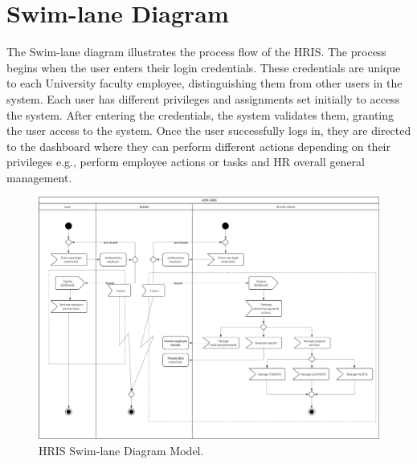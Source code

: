 
\section{Swim-lane Diagram}
The Swim-lane diagram illustrates the process flow of the HRIS. The process begins when the user enters their login credentials. These credentials are unique to each University faculty employee, distinguishing them from other users in the system. Each user has different privileges and assignments set initially to access the system. After entering the credentials, the system validates them, granting the user access to the system. Once the user successfully logs in, they are directed to the dashboard where they can perform different actions depending on their privileges e.g., perform employee actions or tasks and HR overall general management.

\begin{figure}[H]
    \centering
    \includegraphics[width=1\linewidth]{figures/images/swimlane.png}
    \caption{HRIS Swim-lane Diagram Model.}
    \label{fig:swimlane}
\end{figure}

